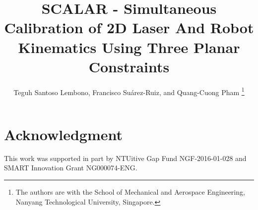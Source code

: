\documentclass[letterpaper, 10 pt, conference]{ieeeconf}
\title{\LARGE
  \textbf{SCALAR - Simultaneous Calibration of 2D Laser And Robot Kinematics Using Three Planar Constraints}}
\author{Teguh Santoso Lembono, Francisco Su\'{a}rez-Ruiz, and Quang-Cuong Pham%
  \thanks{The authors are with the School of Mechanical and Aerospace
          Engineering, Nanyang Technological University, Singapore.}}
\begin{document}
\maketitle
\thispagestyle{empty}
\pagestyle{empty}








\section*{Acknowledgment}
This work was supported in part by NTUitive Gap Fund NGF-2016-01-028
and SMART Innovation Grant NG000074-ENG.




\end{document}
